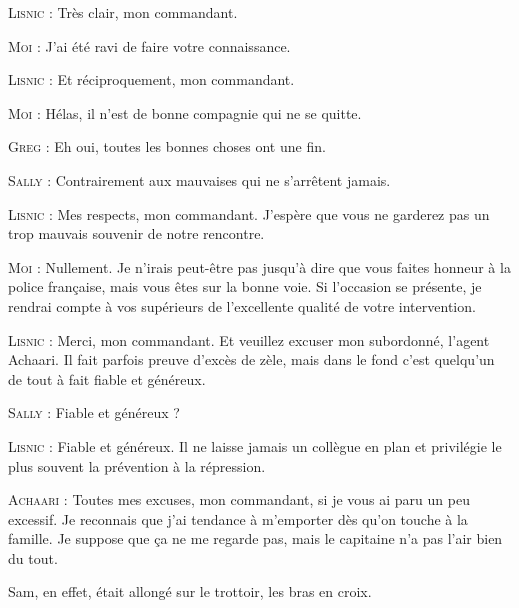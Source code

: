 \begin{dialogue}
\textsc{Lisnic} : Très clair, mon commandant.

\textsc{Moi} : J’ai été ravi de faire votre connaissance.

\textsc{Lisnic} : Et réciproquement, mon commandant.

\textsc{Moi} : Hélas, il n’est de bonne compagnie qui ne se quitte.

\textsc{Greg} : Eh oui, toutes les bonnes choses ont une fin.

\textsc{Sally} : Contrairement aux mauvaises qui ne s’arrêtent jamais.

\textsc{Lisnic} : Mes respects, mon commandant. J’espère que vous ne garderez pas un trop mauvais souvenir de notre rencontre.

\textsc{Moi} : Nullement. Je n’irais peut-être pas jusqu’à dire que vous faites honneur à la police française, mais vous êtes sur la bonne voie. Si l’occasion se présente, je rendrai compte à vos supérieurs de l’excellente qualité de votre intervention.

\textsc{Lisnic} : Merci, mon commandant. Et veuillez excuser mon subordonné, l’agent Achaari. Il fait parfois preuve d’excès de zèle, mais dans le fond c’est quelqu’un de tout à fait fiable et généreux.

\textsc{Sally} : Fiable et généreux ?

\textsc{Lisnic} : Fiable et généreux. Il ne laisse jamais un collègue en plan et privilégie le plus souvent la prévention à la répression.

\textsc{Achaari} : Toutes mes excuses, mon commandant, si je vous ai paru un peu excessif. Je reconnais que j’ai tendance à m’emporter dès qu’on touche à la famille. Je suppose que ça ne me regarde pas, mais le capitaine n’a pas l’air bien du tout.

\end{dialogue}

Sam, en effet, était allongé sur le trottoir, les bras en croix.

